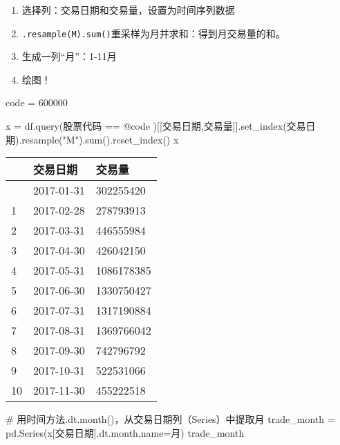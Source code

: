 \documentclass[
  letterpaper,
  DIV=11,
  numbers=noendperiod]{scrreprt}
\newenvironment{Shaded}{\begin{snugshade}}{\end{snugshade}}
\newcommand{\BuiltInTok}[1]{\textcolor[rgb]{0.00,0.23,0.31}{#1}}
\newcommand{\CommentTok}[1]{\textcolor[rgb]{0.37,0.37,0.37}{#1}}
\newcommand{\NormalTok}[1]{\textcolor[rgb]{0.00,0.23,0.31}{#1}}
\newcommand{\OperatorTok}[1]{\textcolor[rgb]{0.37,0.37,0.37}{#1}}
\newcommand{\StringTok}[1]{\textcolor[rgb]{0.13,0.47,0.30}{#1}}
\providecommand{\tightlist}{%
  \setlength{\itemsep}{0pt}\setlength{\parskip}{0pt}}\usepackage{longtable,booktabs,array}
\begin{document}
\begin{enumerate}
\def\labelenumi{\arabic{enumi}.}
\tightlist
\item
  选择列：交易日期和交易量，设置为时间序列数据
\item
  \texttt{.resample(\textquotesingle{}M\textquotesingle{}).sum()}重采样为月并求和：得到月交易量的和。
\item
  生成一列``月''：1-11月
\item
  绘图！
\end{enumerate}

\begin{Shaded}
\begin{Highlighting}[]
\NormalTok{code }\OperatorTok{=} \StringTok{\textquotesingle{}600000\textquotesingle{}}

\NormalTok{x }\OperatorTok{=}\NormalTok{ df.query(}\StringTok{\textquotesingle{}股票代码 == @code \textquotesingle{}}\NormalTok{)[[}\StringTok{\textquotesingle{}交易日期\textquotesingle{}}\NormalTok{,}\StringTok{\textquotesingle{}交易量\textquotesingle{}}\NormalTok{]].set\_index(}\StringTok{\textquotesingle{}交易日期\textquotesingle{}}\NormalTok{).resample(}\StringTok{"M"}\NormalTok{).}\BuiltInTok{sum}\NormalTok{().reset\_index()}
\NormalTok{x}
\end{Highlighting}
\end{Shaded}

\begin{longtable}[]{@{}lll@{}}
\toprule\noalign{}
& 交易日期 & 交易量 \\
\midrule\noalign{}
\endhead
\bottomrule\noalign{}
\endlastfoot
0 & 2017-01-31 & 302255420 \\
1 & 2017-02-28 & 278793913 \\
2 & 2017-03-31 & 446555984 \\
3 & 2017-04-30 & 426042150 \\
4 & 2017-05-31 & 1086178385 \\
5 & 2017-06-30 & 1330750427 \\
6 & 2017-07-31 & 1317190884 \\
7 & 2017-08-31 & 1369766042 \\
8 & 2017-09-30 & 742796792 \\
9 & 2017-10-31 & 522531066 \\
10 & 2017-11-30 & 455222518 \\
\end{longtable}

\begin{Shaded}
\begin{Highlighting}[]
\CommentTok{\# 用时间方法\textasciigrave{}.dt.month()\textasciigrave{}，从交易日期列（Series）中提取月}
\NormalTok{trade\_month }\OperatorTok{=}\NormalTok{ pd.Series(x[}\StringTok{\textquotesingle{}交易日期\textquotesingle{}}\NormalTok{].dt.month,name}\OperatorTok{=}\StringTok{\textquotesingle{}月\textquotesingle{}}\NormalTok{)}
\NormalTok{trade\_month}
\end{Highlighting}
\end{Shaded}
\end{document}
